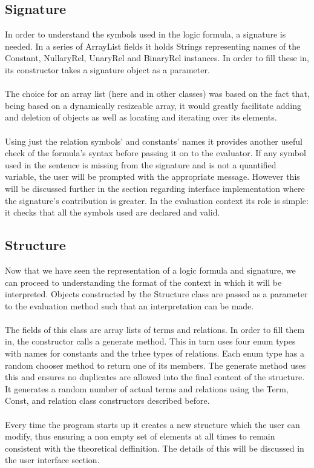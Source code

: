 \documentclass{report}
\begin{document}
\subsection{Signature}
In order to understand the symbols used in the logic formula, a signature is needed. In a series of ArrayList fields it holds Strings representing names of the Constant, NullaryRel, UnaryRel and BinaryRel instances. In order to fill these in, its constructor takes a signature object as a parameter.\\ \\
The choice for an array list (here and in other classes) was based on the fact that, being based on a dynamically resizeable array, it would greatly facilitate adding and deletion of objects as well as locating and iterating over its elements. \\ \\
Using just the relation symbols' and constants' names it provides another useful check of the formula's syntax before passing it on to the evaluator. If any symbol used in the sentence is missing from the signature and is not a quantified variable, the user will be prompted with the appropriate message. However this will be discussed further in the section regarding interface implementation where the signature's contribution is greater. In the evaluation context its role is simple: it checks that all the symbols used are declared and valid.

\subsection{Structure}
Now that we have seen the representation of a logic formula and signature, we can proceed to understanding the format of the context in which it will be interpreted. Objects constructed by the Structure class are passed as a parameter to the evaluation method such that an interpretation can be made. \\ \\
The fields of this class are array lists of terms and relations. In order to fill them in, the constructor calls a generate method. This in turn uses four enum types with names for constants and the trhee types of relations. Each enum type has a random chooser method to return one of its members. The generate method uses this and ensures no duplicates are allowed into the final content of the structure. It generates a random number of actual terms and relations using the Term, Const, and relation class constructors described before. \\ \\
Every time the program starts up it creates a new structure which the user can modify, thus ensuring a non empty set of elements at all times to remain consistent with the theoretical deffinition. The details of this will be discussed in the user interface section.
\end{document}
